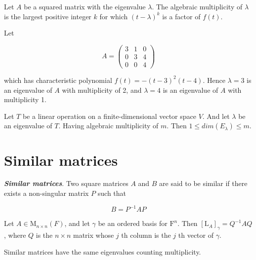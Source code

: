 \documentclass{report}
\begin{document}
    \begin{defBox}
        Let $A$ be a squared matrix with the eigenvalue $\lambda$. The algebraic multiplicity of $\lambda$ is the largest positive integer $k$ for which $(t-\lambda)^k$ is a factor of $f(t)$.
    \end{defBox}

    \begin{Example}
        Let

        $$A =\begin{pmatrix}
            3 & 1 & 0\\
            0 & 3 & 4\\
            0 & 0 & 4
        \end{pmatrix}$$

        which has characteristic polynomial $f(t) = -(t-3)^2(t-4)$. Hence $\lambda = 3$ is an eigenvalue of $A$ with multiplicity of 2, and $\lambda = 4$ is an eigenvalue of $A$ with multiplicity 1.
    \end{Example}

    \begin{thBox}
        Let $T$ be a linear operation on a finite-dimensional vector space $V$. And let $\lambda$ be an eigenvalue of $T$. Having algebraic multiplicity of $m$. Then $1 \leq dim(E_\lambda) \leq m$.
    \end{thBox}

    \section{Similar matrices}

    \begin{defBox}
        \textit{\textbf{Similar matrices}}. Two square matrices $A$ and $B$ are said to be similar if there exists a non-singular matrix $P$ such that

        $$B = P^{-1}AP$$
    \end{defBox}

    \begin{thBox}
        Let $A \in \mathrm{M}_{n \times n}(F)$, and let $\gamma$ be an ordered basis for $\mathrm{F}^n$. Then $\left[\mathrm{L}_A\right]_\gamma=Q^{-1} A Q$, where $Q$ is the $n \times n$ matrix whose $j$ th column is the $j$ th vector of $\gamma$.
    \end{thBox}

    \begin{thBox}
        Similar matrices have the same eigenvalues counting multiplicity.
    \end{thBox}
\end{document}
